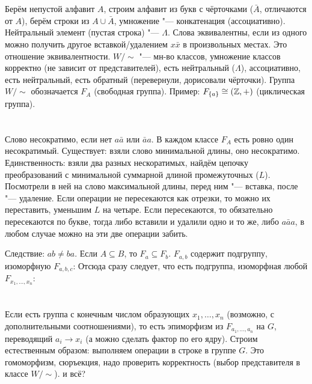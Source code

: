 \section{} %
Берём непустой алфавит $A$, строим алфавит из букв с чёрточками ($\bar A$, отличаются от $A$),
берём строки из $A\cup \bar A$, умножение "--- конкатенация (ассоциативно).
Нейтральный элемент (пустая строка) "--- $\Lambda$.
Слова эквивалентны, если из одного можно получить другое вставкой/удалением $x\bar x$ в произвольных местах.
Это отношение эквивалентности.
$W/\sim$ "--- мн-во классов, умножение классов корректно (не зависит от представителей),
есть нейтральный ($\Lambda$), ассоциативно, есть нейтральный, есть обратный (перевернули, дорисовали чёрточки).
Группа $W/\sim$ обозначается $F_A$ (свободная группа).
Пример: $F_{\{a\}} \cong (\mathbb{Z}, +)$ (циклическая группа).

\section{} %
Слово несократимо, если нет $a\bar a$ или $\bar a a$.
В каждом классе $F_A$ есть ровно один несократимый.
Существует: взяли слово минимальной длины, оно несократимо.
Единственность: взяли два разных нескоратимых, найдём цепочку преобразований с минимальной суммарной длиной промежуточных ($L$).
Посмотрели в ней на слово максимальной длины, перед ним "--- вставка, после "--- удаление.
Если операции не пересекаются как отрезки, то можно их переставить, уменьшим $L$ на четыре.
Если пересекаются, то обязательно пересекаются по букве, тогда либо вставили и удалили одно и то же,
либо $a\bar a a$, в любом случае можно на эти две операции забить.

Следствие: $ab\neq ba$.
Если $A \subseteq B$, то $F_a \subseteq F_b$.
$F_{a, b}$ содержит подгруппу, изоморфную $F_{a,b,c}$: \TODO
Отсюда сразу следует, что есть подгруппа, изоморфная любой $F_{x_1, \dots, x_n}$: \TODO

\section{} %
Если есть группа с конечным числом образующих $x_1, \dots, x_n$ (возможно, с дополнительными соотношениями),
то есть эпиморфизм из $F_{a_1, \dots, a_n}$ на $G$, переводящий $a_i \to x_i$ (а можно сделать фактор по его ядру).
Строим естественным образом: выполняем операции в строке в группе $G$.
Это гомоморфизм, сюръекция, надо проверить корректность (выбор представителя в классе $W/\sim$).
\TODO и всё?

